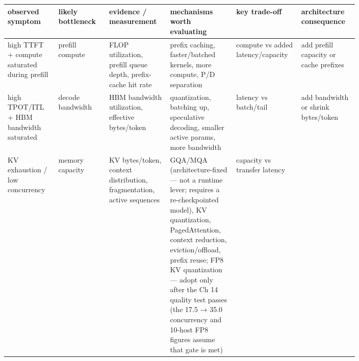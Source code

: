 \nopagebreak[4]
\begin{longtable}[]{@{}
  >{\raggedright\arraybackslash}p{0.1257\linewidth}
  >{\raggedright\arraybackslash}p{0.1257\linewidth}
  >{\raggedright\arraybackslash}p{0.1257\linewidth}
  >{\raggedright\arraybackslash}p{0.1676\linewidth}
  >{\raggedright\arraybackslash}p{0.1257\linewidth}
  >{\raggedright\arraybackslash}p{0.1257\linewidth}@{}}
\toprule\noalign{}
\begin{minipage}[b]{\linewidth}\raggedright
observed symptom
\end{minipage} & \begin{minipage}[b]{\linewidth}\raggedright
likely bottleneck
\end{minipage} & \begin{minipage}[b]{\linewidth}\raggedright
evidence / measurement
\end{minipage} & \begin{minipage}[b]{\linewidth}\raggedright
mechanisms worth evaluating
\end{minipage} & \begin{minipage}[b]{\linewidth}\raggedright
key trade-off
\end{minipage} & \begin{minipage}[b]{\linewidth}\raggedright
architecture consequence
\end{minipage} \\
\midrule\noalign{}
\endhead
\bottomrule\noalign{}
\endlastfoot
high TTFT + compute saturated during prefill & prefill compute & FLOP
utilization, prefill queue depth, prefix-cache hit rate & prefix
caching, faster/batched kernels, more compute, P/D separation & compute
vs added latency/capacity & add prefill capacity or cache prefixes \\
\noalign{\label{tab:15.2}}
high TPOT/ITL + HBM bandwidth saturated & decode bandwidth & HBM
bandwidth utilization, effective bytes/token & quantization, batching
up, speculative decoding, smaller active params, more bandwidth &
latency vs batch/tail & add bandwidth or shrink bytes/token \\
KV exhaustion / low concurrency & memory capacity & KV bytes/token,
context distribution, fragmentation, active sequences & GQA/MQA
(architecture-fixed --- not a runtime lever; requires a re-checkpointed
model), KV quantization, PagedAttention, context reduction,
eviction/offload, prefix reuse; FP8 KV quantization --- adopt only after
the Ch 14 quality test passes (the 17.5 → 35.0 concurrency and 10-host
FP8 figures assume that gate is met) & capacity vs transfer latency &

\end{longtable}
